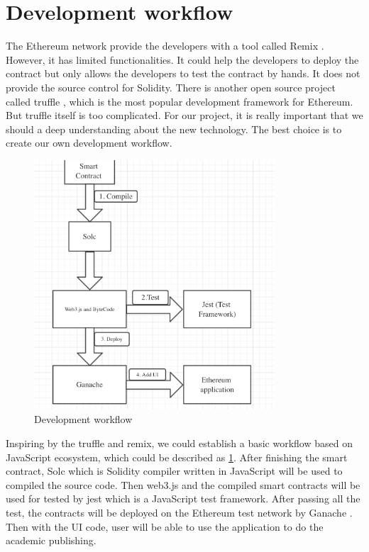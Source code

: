 \documentclass[openany,12pt]{ecsthesis}      %
\begin{document}
\section{Development workflow}
The Ethereum network provide the developers with a tool called Remix \cite{remix}. 
However, it has limited functionalities. 
It could help the developers to deploy the contract but only allows the developers to test the contract by hands.
It does not provide the source control for Solidity. There is another open source project called truffle \cite{truffle}, 
which is the most popular development framework for Ethereum. But truffle itself is too complicated. For our project, 
it is really important that we should a deep understanding about the new technology. The best choice is to create our own development workflow.
\begin{figure}[H]
  \centering
  \includegraphics[width=0.8\textwidth]{developWorkFlow.png}
  \caption{Development workflow}
  \label{develop} 
\end{figure}
Inspiring by the truffle and remix, we could establish a basic workflow based on JavaScript ecosystem, which could be described as \ref{develop}.
After finishing the smart contract, Solc \cite{solc} which is Solidity compiler written in JavaScript will be used to compiled the source code.
Then web3.js and the compiled smart contracts will be used for tested by jest \cite{jest} which is a JavaScript test framework. 
After passing all the test, the contracts will be deployed on the Ethereum test network by Ganache \cite{ganache}.
Then with the UI code, user will be able to use the application to do the academic publishing.
\end{document}
